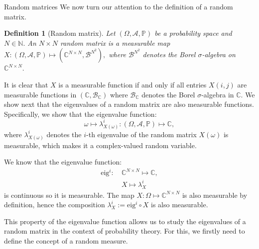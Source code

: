 \documentclass[11pt, a4paper, oneside]{book}
\numberwithin{equation}{chapter}
\newtheorem{definition}{Definition}[section]
\begin{document}
\begin{section}{Random matrices}
We now turn our attention to the definition of a random matrix.
%
\begin{definition}[Random matrix]
Let $(\Omega, \mathcal{A}, \mathbb{P})$ be a probability space and $N \in \mathbb{N}.$ An $N \times N$ random matrix is a measurable map $X: (\Omega,\mathcal{A}, \mathbb{P}) \mapsto (\mathbb{C}^{N \times N}, \mathcal{B}^{N^2}),$ where $\mathcal{B}^{N^2}$ denotes the Borel $\sigma$-algebra on $\mathbb{C}^{N \times N}.$
\end{definition}
%
It is clear that $X$ is a measurable function if and only if all entries $X(i,j)$ are measurable functions in $(\mathbb{C},\mathcal{B}_{\mathbb{C}})$ where $\mathcal{B}_{\mathbb{C}}$ denotes the Borel $\sigma$-algebra in $\mathbb{C}.$
%
We show next that the eigenvalues of a random matrix are also measurable functions. Specifically, we show that the eigenvalue function:
\[
\omega \mapsto \lambda_{X(\omega)}^i: (\Omega, \mathcal{A}, \mathbb{P}) \mapsto \mathbb{C},
\]
where $\lambda_{X(\omega)}^i$ denotes the $i$-th eigenvalue of the random matrix $X(\omega)$ is measurable, which makes it a complex-valued random variable.

We know that the eigenvalue function:
\begin{align*}
\mathrm{eig}^i: \ &\mathbb{C}^{N \times N} \mapsto \mathbb{C} , \\
&X \mapsto \lambda_X^i
\end{align*}
is continuous so it is measurable. The map $X: \Omega \mapsto \mathbb{C}^{N \times N}$ is also measurable by definition, hence the composition $\lambda_X^i:= \mathrm{eig}^i \circ X$ is also measurable.

This property of the eigenvalue function allows us to study the eigenvalues of a random matrix in the context of probability theory. For this, we firstly need to define the concept of a random measure.

\end{section}
\end{document}
